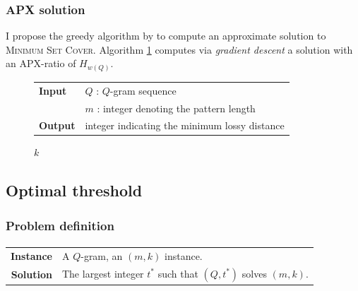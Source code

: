 \subsubsection{APX solution}

I propose the greedy algorithm by \cite{Chvatal1979} to compute an approximate solution to \textsc{Minimum Set Cover}.
Algorithm \ref{alg:qgram-maxdist-apx} computes via \emph{gradient descent} a solution with an APX-ratio of $H_{w(Q)}$.

\begin{figure}[h]
\begin{center}
\begin{minipage}[t]{.8\textwidth}
\begin{algorithm}[H]
\begin{tabular}{ll}
\textbf{Input}  & $Q$ : $Q$-gram sequence\\
				& $m$ : integer denoting the pattern length\\
\textbf{Output} & integer indicating the minimum lossy distance\\
\end{tabular}
\begin{algorithmic}[1]
\EndWhile
\State \Return $k$
\end{algorithmic}
\label{alg:qgram-maxdist-apx}
\end{algorithm}
\end{minipage}
\end{center}
\end{figure}

\subsection{Optimal threshold}
\label{sub:qgram-optimal-threshold}


\subsubsection{Problem definition}

\paragraph{}
\begin{tabular}{rl}
{\bf Instance}	&	A $Q$-gram, an $(m,k)$ instance.\\
{\bf Solution}	&	The largest integer $t^*$ such that $(Q,t^*)$ solves $(m,k)$.\\
\end{tabular}
\\

